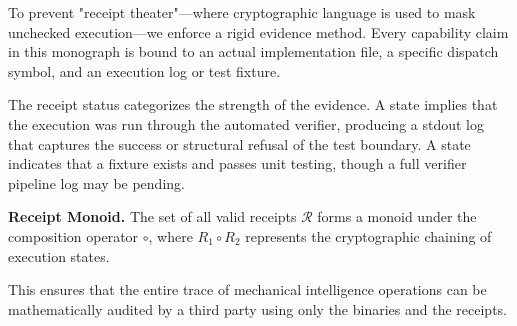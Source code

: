 To prevent "receipt theater"—where cryptographic language is used to mask unchecked execution—we enforce a rigid evidence method. Every capability claim in this monograph is bound to an actual implementation file, a specific dispatch symbol, and an execution log or test fixture.

The receipt status categorizes the strength of the evidence. A  state implies that the execution was run through the automated verifier, producing a stdout log that captures the success or structural refusal of the test boundary. A  state indicates that a fixture exists and passes unit testing, though a full verifier pipeline log may be pending.

\begin{definition}
\textbf{Receipt Monoid.} The set of all valid receipts $\mathcal{R}$ forms a monoid under the composition operator $\circ$, where $R_1 \circ R_2$ represents the cryptographic chaining of execution states.
\end{definition}

This ensures that the entire trace of mechanical intelligence operations can be mathematically audited by a third party using only the binaries and the receipts.
